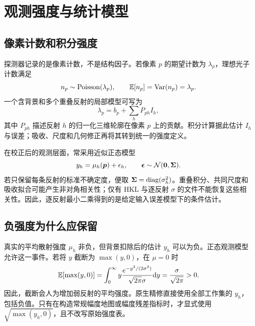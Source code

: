 \chapter{观测强度与统计模型}
\section{像素计数和积分强度}
探测器记录的是像素计数，不是结构因子。若像素 $p$ 的期望计数为 $\lambda_p$，理想光子计数满足
\begin{equation}
n_p\sim\operatorname{Poisson}(\lambda_p),\qquad
\mathbb{E}[n_p]=\operatorname{Var}(n_p)=\lambda_p.
\end{equation}
一个含背景和多个重叠反射的局部模型可写为
\begin{equation}
\lambda_p=b_p+\sum_{h}P_{ph}I_h,
\label{eq:pixel_model}
\end{equation}
其中 $P_{ph}$ 描述反射 $h$ 的归一化三维轮廓在像素 $p$ 上的贡献。积分计算据此估计 $I_h$ 与误差；吸收、尺度和几何修正再将其转到统一的强度定义。

在校正后的观测层面，常采用近似正态模型
\begin{equation}
y_h=\mu_h(\bm{p})+\epsilon_h,\qquad
\bm{\epsilon}\sim\mathcal N(\bm{0},\bm{\Sigma}).
\label{eq:intensity_gaussian}
\end{equation}
若只保留每条反射的标准不确定度，便取 $\bm{\Sigma}=\operatorname{diag}(\sigma_h^2)$。重叠积分、共同尺度和吸收拟合可能产生非对角相关性；仅有 HKL 与逐反射 $\sigma$ 的文件不能恢复这些相关性。因此，逐反射最小二乘得到的是给定输入误差模型下的条件估计。

\section{负强度为什么应保留}
真实的平均散射强度 $\mu_h$ 非负，但背景扣除后的估计 $y_h$ 可以为负。正态观测模型允许这一事件。若将 $y$ 截断为 $\max(y,0)$，在 $\mu=0$ 时
\begin{equation}
\mathbb{E}[\max(y,0)]
=\int_0^\infty y\frac{e^{-y^2/(2\sigma^2)}}{\sqrt{2\pi}\sigma}\mathrm{d} y
=\frac{\sigma}{\sqrt{2\pi}}>0.
\end{equation}
因此，截断会人为增加弱反射的平均强度。原生精修直接使用全部工作集的 $y_h$，包括负值。只有在构造常规幅度地图或幅度残差指标时，才显式使用 $\sqrt{\max(y_h,0)}$，且不改写原始强度表。

